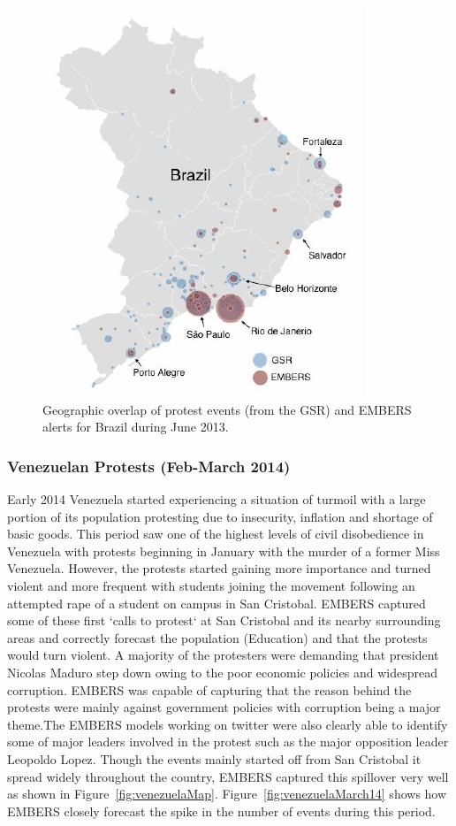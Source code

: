 \documentclass[11pt,a4paper,extrafontsizes,oneside]{article}
\begin{document}
\begin{figure} \centering
\includegraphics[height=.6\columnwidth]{brazilJune13_map}
\caption{Geographic overlap of protest events (from the GSR) and EMBERS
alerts for Brazil during June 2013.}
\label{fig:brazilJune13_map}
\end{figure}

\subsubsection*{Venezuelan Protests (Feb-March 2014)}
Early 2014 Venezuela started experiencing a situation of turmoil with a
large portion of its population protesting due to insecurity, inflation
and shortage of basic goods. This period saw one of the highest levels of
civil disobedience in Venezuela with protests beginning in January with the murder
of a former Miss Venezuela. However, the protests started gaining more importance
 and turned violent and more frequent with students joining the movement following an
attempted rape of a student on campus in San Cristobal. EMBERS captured
some of these first `calls to protest` at San Cristobal and its nearby surrounding areas
 and correctly forecast the population (Education) and that the protests would turn violent.
A majority of the protesters were demanding that president Nicolas Maduro step down owing
to the poor economic policies and widespread corruption. EMBERS was capable of capturing
that the reason behind the protests were mainly against government policies with corruption being
a major theme.The EMBERS models working on twitter were also clearly able to identify some of major
leaders involved in the protest such as the major opposition leader Leopoldo Lopez.
Though the events mainly started off from San Cristobal it spread widely throughout the country, EMBERS
captured this spillover very well as shown in Figure~\ref{fig:venezuelaMap}.
Figure~\ref{fig:venezuelaMarch14}
shows how EMBERS closely forecast the spike in the number of events  during this period.
\end{document}
